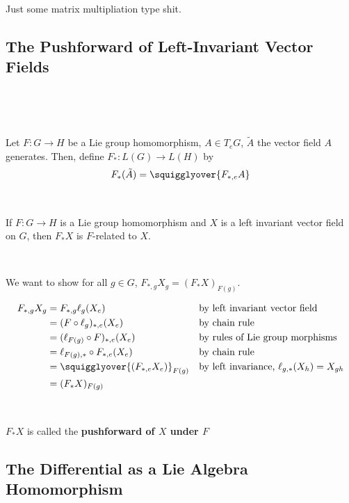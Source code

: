 \documentclass{article}
\begin{document}
\begin{customproof}
  \

  Just some matrix multipliation type shit.
\end{customproof}

\subsection{The Pushforward of Left-Invariant Vector Fields}
\

\begin{definition}
  \

  Let $F: G \to H$ be a Lie group homomorphism, $A \in T_eG$, $\tilde{A}$ the vector field $A$ generates. Then, define $F_*: L(G) \to L(H)$ by $$F_*(\tilde{A}) = \squigglyover{F_{*,e}A}$$
\end{definition}

\begin{proposition}
  \

  If $F: G \to H$ is a Lie group homomorphism and $X$ is a left invariant vector field on $G$, then $F_*X$ is $F$-related to $X$.
\end{proposition}

\begin{customproof}
  \

  We want to show for all $g \in G$, $F_{*,g}X_g = (F_*X)_{F(g)}$.

  \begin{align*}
    F_{*,g}X_g &= F_{*,g}\ell_g(X_e) && \text{by left invariant vector field}\\
    &= (F \circ \ell_g)_{*, e}(X_e) && \text{by chain rule}\\
    &= (\ell_{F(g)} \circ F)_{*, e}(X_e) && \text{by rules of Lie group morphisms}\\
    &= \ell_{F(g), *} \circ F_{*,e}(X_e) && \text{by chain rule}\\
    &= \squigglyover{(F_{*,e}X_e)}_{F(g)} && \text{by left invariance, $\ell_{g,*}(X_h) = X_{gh}$}\\
    &= (F_*X)_{F(g)}
  \end{align*}
\end{customproof}

\begin{definition}
  \

  $F_*X$ is called the \textbf{pushforward of $X$ under $F$}
\end{definition}

\subsection{The Differential as a Lie Algebra Homomorphism}
\
\end{document}
